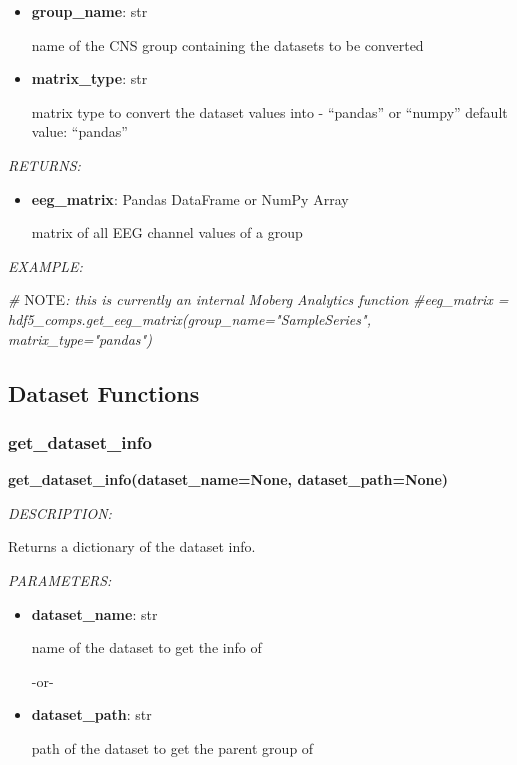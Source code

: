\documentclass[
]{article}
\newenvironment{Shaded}{\begin{snugshade}}{\end{snugshade}}
\newcommand{\AlertTok}[1]{\textcolor[rgb]{0.94,0.16,0.16}{#1}}
\newcommand{\CommentTok}[1]{\textcolor[rgb]{0.56,0.35,0.01}{\textit{#1}}}
\begin{document}
\begin{itemize}
\item
  \textbf{group\_name}: str

  name of the CNS group containing the datasets to be converted
\item
  \textbf{matrix\_type}: str

  matrix type to convert the dataset values into - ``pandas'' or ``numpy''
  default value: ``pandas''
\end{itemize}

\emph{RETURNS:}

\begin{itemize}
\item
  \textbf{eeg\_matrix}: Pandas DataFrame or NumPy Array

  matrix of all EEG channel values of a group
\end{itemize}

\emph{EXAMPLE:}

\begin{Shaded}
\begin{Highlighting}[]
\CommentTok{# }\AlertTok{NOTE}\CommentTok{: this is currently an internal Moberg Analytics function}
\CommentTok{#eeg_matrix = hdf5_comps.get_eeg_matrix(group_name="SampleSeries", matrix_type="pandas")}
\end{Highlighting}
\end{Shaded}

\hypertarget{dataset-functions-1}{%
\subsection{Dataset Functions}\label{dataset-functions-1}}

\hypertarget{get_dataset_info}{%
\subsubsection{get\_dataset\_info}\label{get_dataset_info}}

\textbf{get\_dataset\_info(dataset\_name=None, dataset\_path=None)}

\emph{DESCRIPTION:}

Returns a dictionary of the dataset info.

\emph{PARAMETERS:}

\begin{itemize}
\item
  \textbf{dataset\_name}: str

  name of the dataset to get the info of

  -or-
\item
  \textbf{dataset\_path}: str

  path of the dataset to get the parent group of
\end{itemize}
\end{document}
